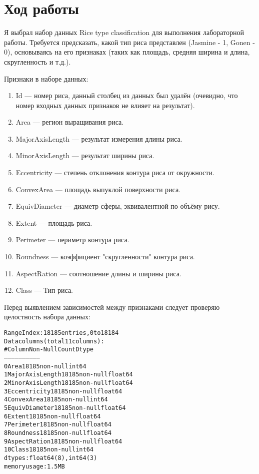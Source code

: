 \graphicspath{{images/}}

\section{Ход работы}

Я выбрал набор данных Rice type classification \cite{kaggle} для выполнения лабораторной работы. Требуется предсказать, 
какой тип риса представлен (Jasmine - 1, Gonen - 0), основываясь на его признаках (таких как площадь, средняя ширина и длина, скругленность и т.д.).

Признаки в наборе данных:

\begin{enumerate}
    \item
    Id --- номер риса, данный столбец из данных был удалён (очевидно, что номер входных данных признаков не влияет на результат).
    \item
    Area --- регион выращивания риса.
    \item
    MajorAxisLength --- результат измерения длины риса.
    \item
    MinorAxisLength --- результат ширины риса.
    \item
    Eccentricity --- степень отклонения контура риса от окружности.
    \item
    ConvexArea --- площадь выпуклой поверхности риса.
    \item
    EquivDiameter --- диаметр сферы, эквивалентной по объёму рису.
    \item
    Extent --- площадь риса.
    \item
    Perimeter --- периметр контура риса.
    \item
    Roundness --- коэффициент "скругленности" контура риса.
    \item
    AspectRation --- соотношение длины и ширины риса.
    \item
    Class --- Тип риса.
\end{enumerate}

Перед выявлением зависимостей между признаками следует проверяю целостность набора данных:
\begin{alltt}
RangeIndex: 18185 entries, 0 to 18184
Data columns (total 11 columns):
 #   Column           Non-Null Count  Dtype  
---  ------           --------------  -----  
 0   Area             18185 non-null  int64  
 1   MajorAxisLength  18185 non-null  float64
 2   MinorAxisLength  18185 non-null  float64
 3   Eccentricity     18185 non-null  float64
 4   ConvexArea       18185 non-null  int64  
 5   EquivDiameter    18185 non-null  float64
 6   Extent           18185 non-null  float64
 7   Perimeter        18185 non-null  float64
 8   Roundness        18185 non-null  float64
 9   AspectRation     18185 non-null  float64
 10  Class            18185 non-null  int64  
dtypes: float64(8), int64(3)
memory usage: 1.5 MB
\end{alltt}

